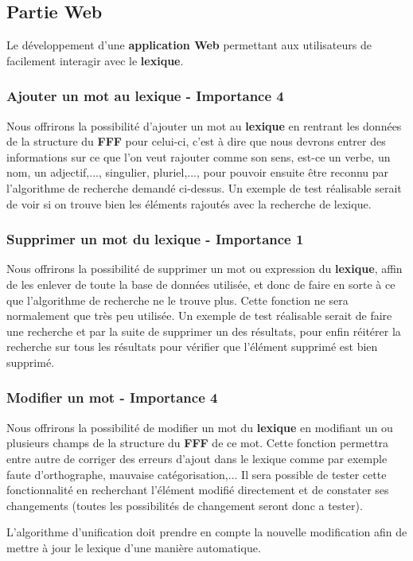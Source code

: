 \subsection{Partie Web}
Le développement d'une \textbf{application Web} permettant aux utilisateurs de facilement interagir avec le \textbf{lexique}.

\subsubsection{Ajouter un mot au lexique - Importance 4}

{Nous offrirons la possibilité d'ajouter un mot au \textbf{lexique} en rentrant les données de la structure du \textbf{FFF} pour celui-ci, c'est à dire que nous devrons entrer des informations sur ce que l'on veut rajouter comme son sens, est-ce un verbe, un nom, un adjectif,..., singulier, pluriel,..., pour pouvoir ensuite être reconnu par l'algorithme de recherche demandé ci-dessus. Un exemple de test réalisable serait de voir si on trouve bien les éléments rajoutés avec la recherche de lexique.\par}

\subsubsection{Supprimer un mot du lexique - Importance 1}
{Nous offrirons la possibilité de supprimer un mot ou expression du \textbf{lexique}, affin de les enlever de toute la base de données utilisée, et donc de faire en sorte à ce que l'algorithme de recherche ne le trouve plus. Cette fonction ne sera normalement que très peu utilisée. Un exemple de test réalisable serait de faire une recherche et par la suite de supprimer un des résultats, pour enfin réitérer la recherche sur tous les résultats pour vérifier que l'élément supprimé est bien supprimé.\par}

\subsubsection{Modifier un mot - Importance 4}
 
{Nous offrirons la possibilité de modifier un mot du \textbf{lexique} en modifiant un ou plusieurs champs de la structure du \textbf{FFF} de ce mot. Cette fonction permettra entre autre de corriger des erreurs d'ajout dans le lexique comme par exemple faute d'orthographe, mauvaise catégorisation,... Il sera possible de tester cette fonctionnalité en recherchant l'élément modifié directement et de constater ses changements (toutes les possibilités de changement seront donc a tester).\par} L'algorithme d'unification doit prendre en compte la nouvelle modification afin de mettre à jour le lexique d'une manière automatique.
 
